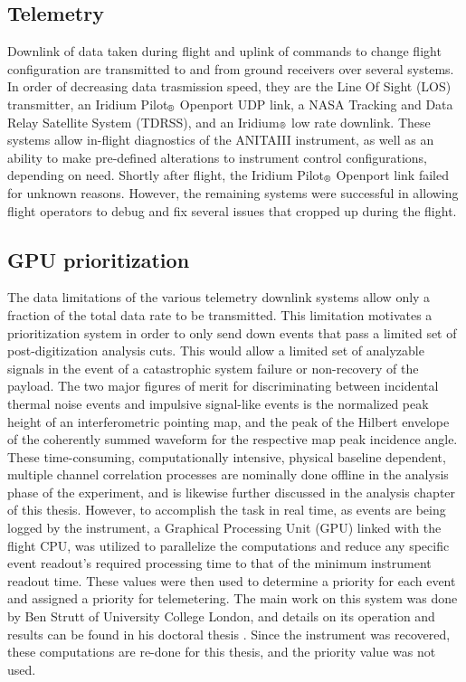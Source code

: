 	
	\subsection{Telemetry}
		Downlink of data taken during flight and uplink of commands to change flight configuration are transmitted to and from ground receivers over several systems.  In order of decreasing data trasmission speed, they are the Line Of Sight (LOS) transmitter, an Iridium Pilot$_{\text{\textregistered}}$ Openport UDP link, a NASA Tracking and Data Relay Satellite System (TDRSS), and an Iridium$_{\text{\textregistered}}$ low rate downlink.  These systems allow in-flight diagnostics of the ANITAIII instrument, as well as an ability to make pre-defined alterations to instrument control configurations, depending on need.  Shortly after flight, the Iridium Pilot$_{\text{\textregistered}}$ Openport link failed for unknown reasons.  However, the remaining systems were successful in allowing flight operators to debug and fix several issues that cropped up during the flight.  %
		
	\begin{table}
	
	\end{table}
		
	\subsection{GPU prioritization}
		The data limitations of the various telemetry downlink systems allow only a fraction of the total data rate to be transmitted.  This limitation motivates a prioritization system in order to only send down events that pass a limited set of post-digitization analysis cuts.  This would allow a limited set of analyzable signals in the event of a catastrophic system failure or non-recovery of the payload.  The two major figures of merit for discriminating between incidental thermal noise events and impulsive signal-like events is the normalized peak height of an interferometric pointing map, and the peak of the Hilbert envelope of the coherently summed waveform for the respective map peak incidence angle.  These time-consuming, computationally intensive, physical baseline dependent, multiple channel correlation processes are nominally done offline in the analysis phase of the experiment, and is likewise further discussed in the analysis chapter of this thesis.  However, to accomplish the task in real time, as events are being logged by the instrument, a Graphical Processing Unit (GPU) linked with the flight CPU, was utilized to parallelize the computations and reduce any specific event readout's required processing time to that of the minimum instrument readout time.  These values were then used to determine a priority for each event and assigned a priority for telemetering.  The main work on this system was done by Ben Strutt of University College London, and details on its operation and results can be found in his doctoral thesis \cite{BenSThesis}.  Since the instrument was recovered, these computations are re-done for this thesis, and the priority value was not used.
		

